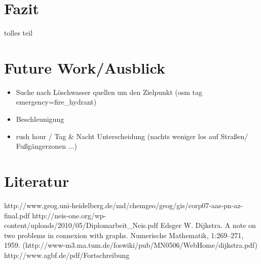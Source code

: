 \documentclass[10pt,a4paper]{article}
\begin{document}
\section{Fazit}

tolles teil

\section{Future Work/Ausblick}
\begin{itemize}
\item Suche nach Löschwasser quellen um den Zielpunkt (osm tag emergency=fire_hydrant)
\item Beschleunigung
\item rush hour / Tag & Nacht Unterscheidung (nachts weniger los auf Straßen/ Fußgängerzonen ...)
\end{itemize}


\section{Literatur}

http://www.geog.uni-heidelberg.de/md/chemgeo/geog/gis/corp07-aas-pn-az-final.pdf
http://neis-one.org/wp-content/uploads/2010/05/Diplomarbeit_Neis.pdf
Edsger W. Dijkstra. A note on two problems in connexion with graphs. Numerische Mathematik,
1:269–271, 1959. (http://www-m3.ma.tum.de/foswiki/pub/MN0506/WebHome/dijkstra.pdf)
http://www.agbf.de/pdf/Fortschreibung%
\end{document}
